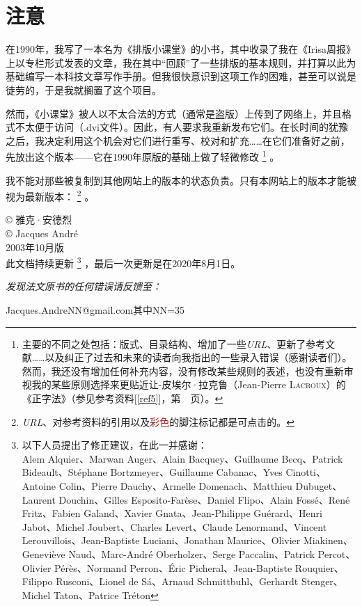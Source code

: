 \chapter*{注意}

在1990年，我写了一本名为《排版小课堂》的小书，其中收录了我在《Irisa周报》上以专栏形式发表的文章，我在其中``回顾''了一些排版的基本规则，并打算以此为基础编写一本科技文章写作手册。但我很快意识到这项工作的困难，甚至可以说是徒劳的，于是我就搁置了这个项目。

然而，《小课堂》被人以不太合法的方式（通常是盗版）上传到了网络上，并且格式不太便于访问（.dvi文件）。因此，有人要求我重新发布它们。在长时间的犹豫之后，我决定利用这个机会对它们进行重写、校对和扩充……在它们准备好之前，先放出这个版本——它在1990年原版的基础上做了轻微修改
    \footnote{主要的不同之处包括：版式、目录结构、增加了一些\emph{URL}、更新了参考文献……以及纠正了过去和未来的读者向我指出的一些录入错误（感谢读者们）。然而，我还没有增加任何补充内容，没有修改某些规则的表述，也没有重新审视我的某些原则选择来更贴近让-皮埃尔·拉克鲁（Jean-Pierre \textsc{Lacroux}）的《正字法》（参见参考资料[\ref{ref5}]，第~\pageref{ref5}~页）。%
    }
。

我不能对那些被复制到其他网站上的版本的状态负责。只有本网站上的版本才能被视为最新版本：
    \footnote{\emph{URL}、对参考资料的引用以及\textcolor{brown}{彩色}的脚注标记都是可点击的。}
。\label{aver}

\begin{flushright}
© 雅克·安德烈\\
© Jacques André\\
2003年10月版\\
此文档持续更新
    \footnote{以下人员提出了修正建议，在此一并感谢：\\
    Alem Alquier、Marwan Auger、Alain Bacquey、Guillaume Becq、Patrick Bideault、Stéphane Bortzmeyer、Guillaume Cabanac、Yves Cinotti、Antoine Colin、Pierre Dauchy、Armelle Domenach、Matthieu Dubuget、Laurent Douchin、Gilles Esposito-Farèse、Daniel Flipo、Alain Fossé、René Fritz、Fabien Galand、Xavier Gnata、Jean-Philippe Guérard、Henri Jabot、Michel Joubert、Charles Levert、Claude Lenormand、Vincent Lerouvillois、Jean-Baptiste Luciani、Jonathan Maurice、Olivier Miakinen、Geneviève Naud、Marc-André Oberholzer、Serge Paccalin、Patrick Percot、Olivier Pérès、Normand Perron、Éric Picheral、Jean-Baptiste Rouquier、Filippo Rusconi、Lionel de Sá、Arnaud Schmittbuhl、Gerhardt Stenger、Michel Taton、Patrice Tréton
    }
，最后一次更新是在2020年8月1日。
\end{flushright}

\vfill
\begin{center}
    \emph{发现法文原书的任何错误请反馈至：
    }

    Jacques.AndreNN@gmail.com\qquad 其中NN=35
\end{center}

